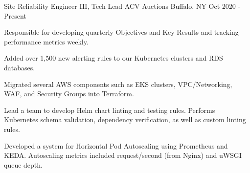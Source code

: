
\begin{cventries}

  \cventry
    {Site Reliability Engineer III, Tech Lead} %
    {ACV Auctions} %
    {Buffalo, NY} %
    {Oct 2020 - Present} %
    {
      \begin{cvitems} %
        \item {Responsible for developing quarterly Objectives and Key Results and tracking performance metrics weekly.}
        \item {Added over 1,500 new alerting rules to our Kubernetes clusters and RDS databases.}
        \item {Migrated several AWS components such as EKS clusters, VPC/Networking, WAF, and Security Groups into Terraform.}
        \item {Lead a team to develop Helm chart linting and testing rules. Performs Kubernetes schema validation, dependency verification, as well as custom linting rules.}
        \item {Developed a system for Horizontal Pod Autoscaling using Prometheus and KEDA. Autoscaling metrics included request/second (from Nginx) and uWSGI queue depth.}
      \end{cvitems}
    }


\end{cventries}
